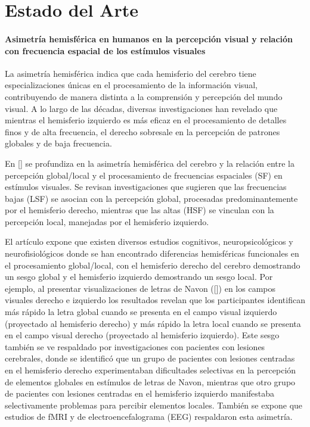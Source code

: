 \chapter{Estado del Arte}\label{chapter:state-of-the-art}

\subsubsection{Asimetr\'ia hemisf\'erica en humanos en la percepci\'on visual y relaci\'on con frecuencia espacial de los est\'imulos visuales}

La asimetría hemisf\'erica indica que cada hemisferio del cerebro tiene especializaciones únicas en el procesamiento de la información visual, contribuyendo de manera distinta a la comprensión y percepción del mundo visual. A lo largo de las décadas, diversas investigaciones han revelado que mientras el hemisferio izquierdo es más eficaz en el procesamiento de detalles finos y de alta frecuencia, el derecho sobresale en la percepción de patrones globales y de baja frecuencia.

En [\cite{flevaris_spatial_2016}] se profundiza en la asimetría hemisférica del cerebro y la relación entre la percepción global/local y el procesamiento de frecuencias espaciales (SF) en estímulos visuales. Se revisan investigaciones que sugieren que las frecuencias bajas (LSF) se asocian con la percepción global, procesadas predominantemente por el hemisferio derecho, mientras que las altas (HSF) se vinculan con la percepción local, manejadas por el hemisferio izquierdo. 

El art\'iculo expone que existen diversos estudios cognitivos, neuropsicológicos y neurofisiológicos donde se han encontrado diferencias hemisféricas funcionales en el procesamiento global/local, con el hemisferio derecho del cerebro demostrando un sesgo global y el hemisferio izquierdo demostrando un sesgo local. Por ejemplo, al presentar visualizaciones de letras de Navon ([\cite{navon_forest_1977}]) en los campos visuales derecho e izquierdo los resultados revelan que los participantes identifican más rápido la letra global cuando se presenta en el campo visual izquierdo (proyectado al hemisferio derecho) y más rápido la letra local cuando se presenta en el campo visual derecho (proyectado al hemisferio izquierdo). Este sesgo también se ve respaldado por investigaciones con pacientes con lesiones cerebrales, donde se identificó que un grupo de pacientes con lesiones centradas en el hemisferio derecho experimentaban dificultades selectivas en la percepción de elementos globales en estímulos de letras de Navon, mientras que otro grupo de pacientes con lesiones centradas en el hemisferio izquierdo manifestaba selectivamente problemas para percibir elementos locales. Tambi\'en se expone que estudios de fMRI  y de electroencefalograma (EEG) respaldaron esta asimetría.

